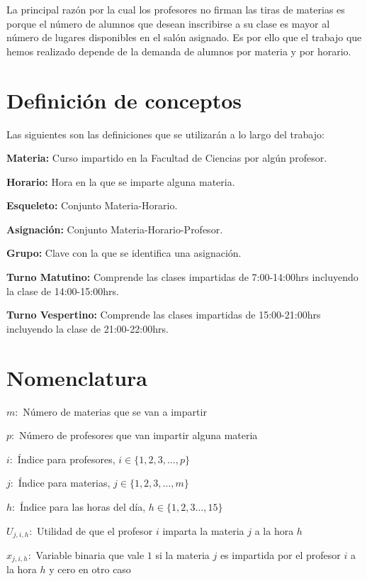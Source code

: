 La principal razón por la cual los profesores no firman las tiras de materias es porque el número de alumnos que desean inscribirse a su clase es mayor al número de lugares disponibles en el salón asignado. Es por ello que el trabajo que hemos realizado depende de la demanda de alumnos por materia y por horario.



\section{Definición de conceptos}

Las siguientes son las definiciones que se utilizarán a lo largo del trabajo:
  
  \textbf{Materia:} Curso impartido en la Facultad de Ciencias por algún profesor.

\textbf{Horario:} Hora en la que se imparte alguna materia.

\textbf{Esqueleto:} Conjunto Materia-Horario.

\textbf{Asignación:} Conjunto Materia-Horario-Profesor.

\textbf{Grupo:} Clave con la que se identifica una asignación.

\textbf{Turno Matutino:} Comprende las clases impartidas de 7:00-14:00hrs incluyendo la clase de 14:00-15:00hrs.

\textbf{Turno Vespertino:} Comprende las clases impartidas de 15:00-21:00hrs incluyendo la clase de 21:00-22:00hrs.


\section{Nomenclatura}

$m:$ Número de materias que se van a impartir

$p:$ Número de profesores que van impartir alguna materia

$i:$ Índice para profesores, $i \in \{ 1, 2, 3, \ldots, p \}$
  
  $j:$ Índice para materias, $j \in \{ 1, 2, 3, \ldots, m \}$
  
  $h:$ Índice para las horas del día, $h \in \{ 1, 2, 3 \ldots, 15\}$
  
  $U_{j,i,h}:$ Utilidad de que el profesor $i$ imparta la materia $j$ a la hora $h$
  
  $x_{j,i,h}:$ Variable binaria que vale $1$ si la materia $j$ es impartida por el profesor $i$ a la hora $h$ y cero en otro caso

